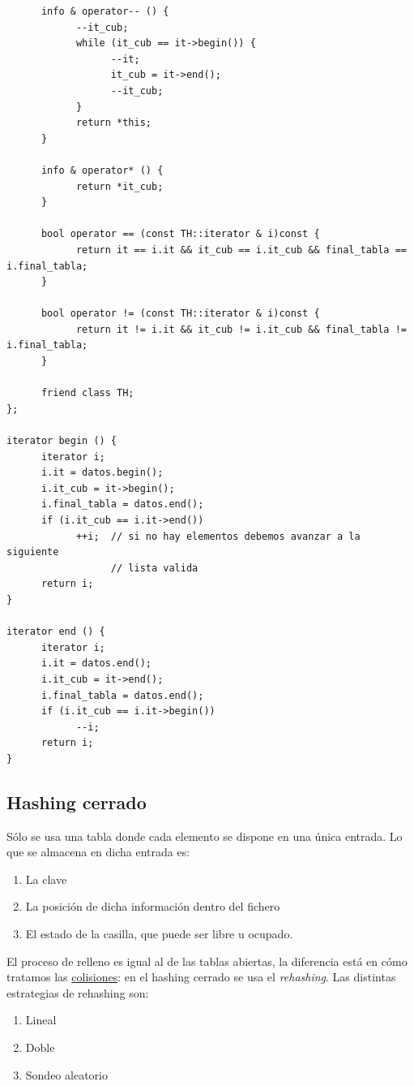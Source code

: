 \documentclass[10pt,a4paper,spanish]{report}
\begin{document}
\begin{enumerate}[a)]
\begin{verbatim}
      info & operator-- () {
            --it_cub;
            while (it_cub == it->begin()) {
                  --it;
                  it_cub = it->end();
                  --it_cub;
            }
            return *this;
      }

      info & operator* () {
            return *it_cub;
      }

      bool operator == (const TH::iterator & i)const {
            return it == i.it && it_cub == i.it_cub && final_tabla == i.final_tabla;
      }

      bool operator != (const TH::iterator & i)const {
            return it != i.it && it_cub != i.it_cub && final_tabla != i.final_tabla;
      }

      friend class TH;
};

iterator begin () {
      iterator i;
      i.it = datos.begin();
      i.it_cub = it->begin();
      i.final_tabla = datos.end();
      if (i.it_cub == i.it->end())
            ++i;  // si no hay elementos debemos avanzar a la siguiente
                  // lista valida
      return i;
}

iterator end () {
      iterator i;
      i.it = datos.end();
      i.it_cub = it->end();
      i.final_tabla = datos.end();
      if (i.it_cub == i.it->begin())
            --i;
      return i;
}
\end{verbatim}
\end{enumerate}

\subsection{\textcolor[rgb]{0.3,0.4,0.8}Hashing cerrado}
\noindent
Sólo se usa una tabla donde cada elemento se dispone en una única entrada. Lo que se almacena en dicha entrada es:
\begin{enumerate}[$\heartsuit$]
      \item La clave
      \item La posición de dicha información dentro del fichero
      \item El estado de la casilla, que puede ser libre u ocupado.
\end{enumerate}

\noindent
El proceso de relleno es igual al de las tablas abiertas, la diferencia está en cómo tratamos las \hyperref[colisiones]{colisiones}: en el hashing cerrado se usa el \textit{\textcolor[rgb]{0.3,0.4,0.8}{rehashing}}. Las distintas estrategias de rehashing son:
\begin{enumerate}[$\bigstar$]
      \item Lineal
      \item Doble
      \item Sondeo aleatorio
\end{enumerate}
\end{document}
